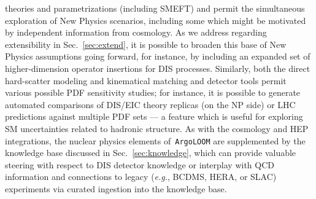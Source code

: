 \documentclass[final,3p,times,sort,compress]{elsarticle}
\newcommand{\AL}{\texttt{ArgoLOOM}\xspace}
\begin{document}
theories and parametrizations (including SMEFT) and permit the simultaneous exploration of New Physics scenarios,
including some which might be motivated by independent information from cosmology. As we address regarding
extensibility in Sec.~\ref{sec:extend}, it is possible to broaden this base of New Physics assumptions going forward,
for instance, by including an expanded set of higher-dimension operator insertions for DIS processes.
%
Similarly, both the direct hard-scatter modeling and kinematical matching and detector tools permit various
possible PDF sensitivity studies; for instance, it is possible to generate automated comparisons of DIS/EIC theory
replicas (on the NP side) or LHC predictions against multiple PDF sets --- a feature which is useful for
exploring SM uncertainties related to hadronic structure.
%
As with the cosmology and HEP integrations, the nuclear physics elements of~\AL are supplemented by
the knowledge base discussed in Sec.~\ref{sec:knowledge}, which can provide valuable steering with respect to
DIS detector knowledge or interplay with QCD information and connections to legacy ({\it e.g.}, BCDMS, HERA, or SLAC)
experiments via curated ingestion into the knowledge base.
%

\end{document}
